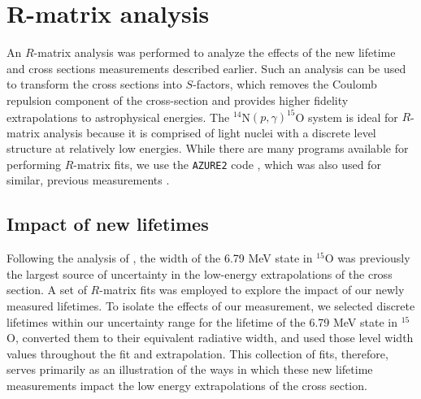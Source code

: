 %
%
%
%
%
%
%
%
%
%


%
%


\chapter{R-matrix analysis}
\label{chap: r-matrix}

An $R$-matrix analysis was performed to analyze the effects of the new lifetime and cross sections measurements described earlier. Such an analysis can be used to transform the cross sections into $S$-factors, which removes the Coulomb repulsion component of the cross-section and provides higher fidelity extrapolations to astrophysical energies. The $^{14}$N$(p,\gamma)^{15}$O system is ideal for $R$-matrix analysis because it is comprised of light nuclei with a discrete level structure at relatively low energies. While there are many programs available for performing $R$-matrix fits, we use the \texttt{AZURE2} code \cite{Azuma2010}, which was also used for similar, previous measurements \cite{Li2016}. 

\section{Impact of new lifetimes}
\label{sec: lifetime fit}

Following the analysis of \citet{Li2016}, the width of the 6.79 MeV state in $^{15}$O  was previously the largest source of uncertainty in the low-energy extrapolations of the cross section. A set of $R$-matrix fits was employed to explore the impact of our newly measured lifetimes. To isolate the effects of our measurement, we selected discrete lifetimes within our uncertainty range for the lifetime of the 6.79 MeV state in $^{15}$O, converted them to their equivalent radiative width, and used those level width values throughout the fit and extrapolation. This collection of fits, therefore, serves primarily as an illustration of the ways in which these new lifetime measurements impact the low energy extrapolations of the cross section.

